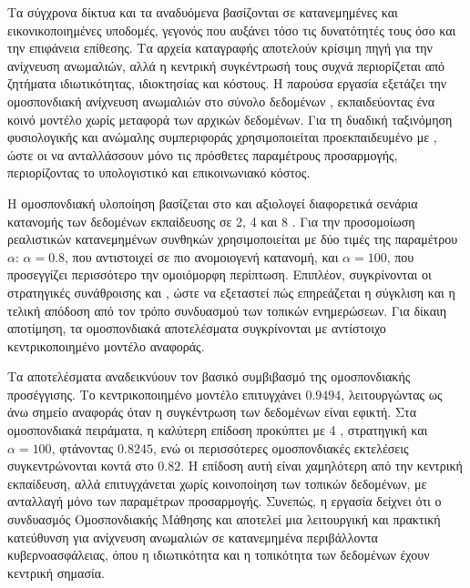 \setcounter{page}{5}
\abstract

Τα σύγχρονα δίκτυα  και τα αναδυόμενα  βασίζονται σε κατανεμημένες και εικονικοποιημένες υποδομές, γεγονός που αυξάνει τόσο τις δυνατότητές τους όσο και την επιφάνεια επίθεσης. Τα αρχεία καταγραφής αποτελούν κρίσιμη πηγή για την ανίχνευση ανωμαλιών, αλλά η κεντρική συγκέντρωσή τους συχνά περιορίζεται από ζητήματα ιδιωτικότητας, ιδιοκτησίας και κόστους. Η παρούσα εργασία εξετάζει την ομοσπονδιακή ανίχνευση ανωμαλιών στο σύνολο δεδομένων , εκπαιδεύοντας ένα κοινό μοντέλο χωρίς μεταφορά των αρχικών δεδομένων. Για τη δυαδική ταξινόμηση φυσιολογικής και ανώμαλης συμπεριφοράς χρησιμοποιείται προεκπαιδευμένο  με , ώστε οι  να ανταλλάσσουν μόνο τις πρόσθετες παραμέτρους προσαρμογής, περιορίζοντας το υπολογιστικό και επικοινωνιακό κόστος.

Η ομοσπονδιακή υλοποίηση βασίζεται στο  και αξιολογεί διαφορετικά σενάρια κατανομής των δεδομένων εκπαίδευσης σε 2, 4 και 8 . Για την προσομοίωση ρεαλιστικών κατανεμημένων συνθηκών χρησιμοποιείται  με δύο τιμές της παραμέτρου \(\alpha\): \(\alpha=0.8\), που αντιστοιχεί σε πιο ανομοιογενή κατανομή, και \(\alpha=100\), που προσεγγίζει περισσότερο την ομοιόμορφη περίπτωση. Επιπλέον, συγκρίνονται οι στρατηγικές συνάθροισης  και , ώστε να εξεταστεί πώς επηρεάζεται η σύγκλιση και η τελική απόδοση από τον τρόπο συνδυασμού των τοπικών ενημερώσεων. Για δίκαιη αποτίμηση, τα ομοσπονδιακά αποτελέσματα συγκρίνονται με αντίστοιχο κεντρικοποιημένο μοντέλο αναφοράς.

Τα αποτελέσματα αναδεικνύουν τον βασικό συμβιβασμό της ομοσπονδιακής προσέγγισης. Το κεντρικοποιημένο μοντέλο επιτυγχάνει  \(0.9494\), λειτουργώντας ως άνω σημείο αναφοράς όταν η συγκέντρωση των δεδομένων είναι εφικτή. Στα ομοσπονδιακά πειράματα, η καλύτερη επίδοση προκύπτει με 4 , στρατηγική  και \(\alpha=100\), φτάνοντας  \(0.8245\), ενώ οι περισσότερες ομοσπονδιακές εκτελέσεις συγκεντρώνονται κοντά στο \(0.82\). Η επίδοση αυτή είναι χαμηλότερη από την κεντρική εκπαίδευση, αλλά επιτυγχάνεται χωρίς κοινοποίηση των τοπικών δεδομένων, με ανταλλαγή μόνο των παραμέτρων προσαρμογής. Συνεπώς, η εργασία δείχνει ότι ο συνδυασμός Ομοσπονδιακής Μάθησης και  αποτελεί μια λειτουργική και πρακτική κατεύθυνση για ανίχνευση ανωμαλιών σε κατανεμημένα περιβάλλοντα κυβερνοασφάλειας, όπου η ιδιωτικότητα και η τοπικότητα των δεδομένων έχουν κεντρική σημασία.

